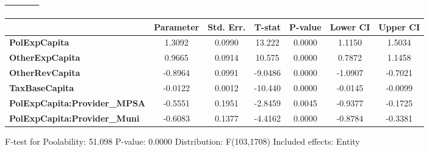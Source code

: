 \begin{center}
\begin{tabular}{lclc}
\textbf{}                            &                    & \textbf{                     }   &                  \\
\bottomrule
\end{tabular}
\begin{tabular}{lcccccc}
                                     & \textbf{Parameter} & \textbf{Std. Err.} & \textbf{T-stat} & \textbf{P-value} & \textbf{Lower CI} & \textbf{Upper CI}  \\
\midrule
\textbf{PolExpCapita}                &       1.3092       &       0.0990       &      13.222     &      0.0000      &       1.1150      &       1.5034       \\
\textbf{OtherExpCapita}              &       0.9665       &       0.0914       &      10.575     &      0.0000      &       0.7872      &       1.1458       \\
\textbf{OtherRevCapita}              &      -0.8964       &       0.0991       &     -9.0486     &      0.0000      &      -1.0907      &      -0.7021       \\
\textbf{TaxBaseCapita}               &      -0.0122       &       0.0012       &     -10.440     &      0.0000      &      -0.0145      &      -0.0099       \\
\textbf{PolExpCapita:Provider\_MPSA} &      -0.5551       &       0.1951       &     -2.8459     &      0.0045      &      -0.9377      &      -0.1725       \\
\textbf{PolExpCapita:Provider\_Muni} &      -0.6083       &       0.1377       &     -4.4162     &      0.0000      &      -0.8784      &      -0.3381       \\
\bottomrule
\end{tabular}
\end{center}

F-test for Poolability: 51.098 \newline
 P-value: 0.0000 \newline
 Distribution: F(103,1708) \newline
  \newline
 Included effects: Entity